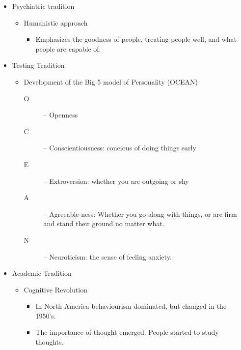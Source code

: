 \documentclass[12pt]{article}
\begin{document}
\begin{itemize}
    \item Psychiatric tradition
        \begin{itemize}
            \item Humanistic approach
                \begin{itemize}
                    \item Emphasizes the goodness of people, treating people
                        well, and what people are capable of.
                \end{itemize}
        \end{itemize}
    \item Testing Tradition
        \begin{itemize}
            \item Development of the Big 5 model of Personality (OCEAN)
                \begin{description}
                    \item[O] -- Openness
                    \item[C] -- Conscientiousness: concious of doing things
                        early
                    \item[E] -- Extroversion: whether you are outgoing or shy
                    \item[A] -- Agreeable-ness: Whether you go along with
                        things, or are firm and stand their ground no matter
                        what.
                    \item[N] -- Neuroticism: the sense of feeling anxiety.
                \end{description}
        \end{itemize}
    \item Academic Tradition
        \begin{itemize}
            \item Cognitive Revolution
                \begin{itemize}
                    \item In North America behaviourism dominated, but changed
                        in the 1950's.
                    \item The importance of thought emerged. People started to
                        study thoughts.
                \end{itemize}
        \end{itemize}
\end{itemize}
\end{document}
